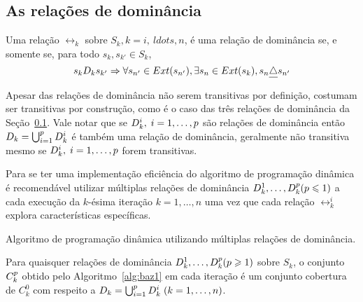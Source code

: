\subsection{As relações de dominância}
\label{sec:domrel}


\begin{mydef}
Uma relação $\rel_k$ sobre $S_k, k = i,\ ldots, n$, é uma relação de dominância
se, e somente se, para todo $s_k, s_{k'} \in S_k$,
\begin{equation}
  s_k D_k s_{{k'}} \Rightarrow \forall s_{{n'}} \in Ext(s_{{n'}}),
    \exists s_n \in Ext(s_k), s_n \underline{\triangle} s_{{n'}}
  \label{eq:domrel}
\end{equation}
\label{def:domrel}
\end{mydef}

Apesar das relações de dominância não serem transitivas por definição,
costumam ser transitivas por construção, como é o caso
das três relações de dominância da Seção~\ref{sec:domrel}.
Vale notar que se $D_k^i, \; i = 1, \ldots, p$ são relações de dominância
então $D_k = \bigcup^{p}_{i = 1} D_k^i$ é também uma relação
de dominância, geralmente não transitiva mesmo se $D_k^i, \; i = 1, \ldots, p$
forem transitivas.

Para se ter uma implementação eficiência do algoritmo de programação dinâmica
é recomendável utilizar múltiplas relações de dominância
$D_k^1, \ldots, D_k^p (p \leqslant 1)$ a cada execução da $k$-ésima iteração
$k = 1, \ldots, n$ uma vez que cada relação $\rel_k^i$ explora características
específicas.

\begin{algorithm}
  \caption{Algoritmo de programação dinâmica utilizando múltiplas relações de dominância.}
  \label{alg:baz1}
  
\end{algorithm}

\begin{myprop}
  Para quaisquer relações de dominância $D_k^1, \ldots, D_k^p (p \geqslant 1)$
  sobre $S_k$, o conjunto $C_k^p$ obtido pelo Algoritmo~\ref{alg:baz1}
  em cada iteração é um conjunto cobertura de $C_k^0$ com respeito a
  $D_k = \bigcup_{i=1}^p D_k^i \; (k = 1, \ldots, n)$.
  \label{prop:coverset}
\end{myprop}

